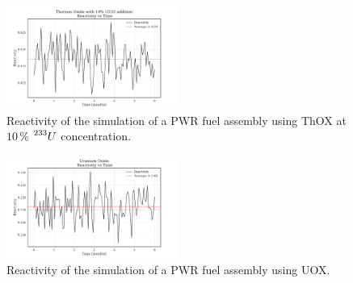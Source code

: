 \begin{figure}
    \centering
    \includegraphics[width=0.5\textwidth, scale=0.5]{Kap7/Figures_Kap7/Reactivity_vs_Time_ThOX_U233_10.pdf}
    \caption{Reactivity of the simulation of a PWR fuel assembly using ThOX at \(10 \, \%\) \(\prescript{233}{}{U}\) concentration.}
    \label{fig:reactivity_th_u233_10}   
\end{figure}

\begin{figure}
    \centering
    \includegraphics[width=0.5\textwidth, scale=0.5]{Kap7/Figures_Kap7/Reactivity_vs_Time_UOX.pdf}
    \caption{Reactivity of the simulation of a PWR fuel assembly using UOX.}
    \label{fig:reactivity_uox}
\end{figure}